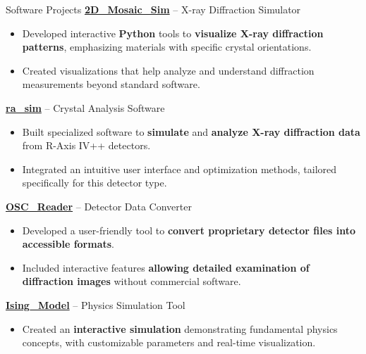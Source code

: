\begin{rubric}{Software Projects}
\entry*[2025--Present]%
  \textbf{\href{https://github.com/DVBeckwitt/2D_Mosaic_Sim}{2D\_Mosaic\_Sim}} – X-ray Diffraction Simulator%
  \begin{itemize}
    \item Developed interactive \textbf{Python} tools to \textbf{visualize X-ray diffraction patterns}, emphasizing materials with specific crystal orientations.
    \item Created visualizations that help analyze and understand diffraction measurements beyond standard software.
  \end{itemize}

  \entry*[2024--Present]%
  \textbf{\href{https://github.com/DVBeckwitt/ra_sim}{ra\_sim}} – Crystal Analysis Software%
  \begin{itemize}
    \item Built specialized software to \textbf{simulate} and \textbf{analyze X-ray diffraction data} from R-Axis IV++ detectors.
    \item Integrated an intuitive user interface and optimization methods, tailored specifically for this detector type.
  \end{itemize}

  \entry*[2024]%
  \textbf{\href{https://github.com/DVBeckwitt/OSC_Reader}{OSC\_Reader}} – Detector Data Converter%
  \begin{itemize}
    \item Developed a user-friendly tool to \textbf{convert proprietary detector files into accessible formats}.
    \item Included interactive features \textbf{allowing detailed examination of diffraction images} without commercial software.
  \end{itemize}

  \entry*[2025]%
  \textbf{\href{https://github.com/DVBeckwitt/Ising_Model}{Ising\_Model}} – Physics Simulation Tool%
  \begin{itemize}
    \item Created an \textbf{interactive simulation} demonstrating fundamental physics concepts, with customizable parameters and real-time visualization.
  \end{itemize}
\end{rubric}
